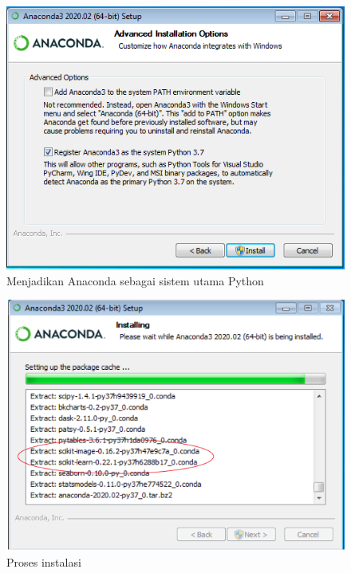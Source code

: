\begin{figure}
  \begin{center}
    \includegraphics[scale=.5]{pics/anacondaInstall5.png}
    \caption{Menjadikan Anaconda sebagai sistem utama Python}
    \label{fig:utama}
  \end{center}
\end{figure}

\begin{figure}
  \begin{center}
    \includegraphics[scale=.5]{pics/anacondaInstall6a.png}
    \caption{Proses instalasi}
    \label{fig:prosesInstalasi}
  \end{center}
\end{figure}

